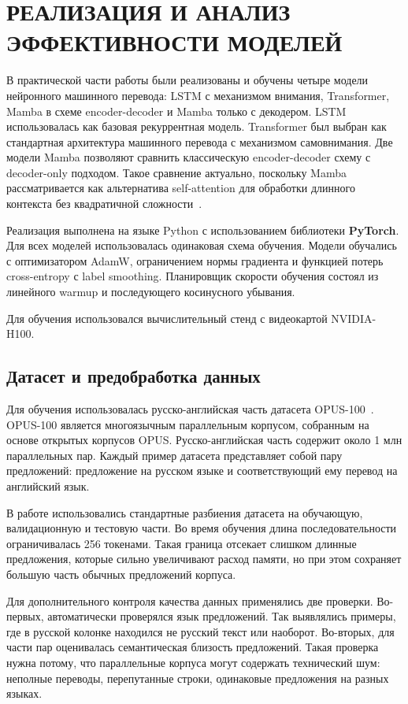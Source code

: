 \section{РЕАЛИЗАЦИЯ И АНАЛИЗ ЭФФЕКТИВНОСТИ МОДЕЛЕЙ}

В практической части работы были реализованы и обучены четыре модели нейронного машинного перевода: LSTM с механизмом внимания, Transformer, Mamba в схеме encoder-decoder и Mamba только с декодером.
LSTM использовалась как базовая рекуррентная модель.
Transformer был выбран как стандартная архитектура машинного перевода с механизмом самовнимания.
Две модели Mamba позволяют сравнить классическую encoder-decoder схему с decoder-only подходом.
Такое сравнение актуально, поскольку Mamba рассматривается как альтернатива self-attention для обработки длинного контекста без квадратичной сложности~\cite{transformer,mtssm}.

Реализация выполнена на языке Python с использованием библиотеки \textbf{PyTorch}.
Для всех моделей использовалась одинаковая схема обучения.
Модели обучались с оптимизатором AdamW, ограничением нормы градиента и функцией потерь cross-entropy с label smoothing.
Планировщик скорости обучения состоял из линейного warmup и последующего косинусного убывания.

Для обучения использовался вычислительный стенд с видеокартой NVIDIA-H100.

\subsection{Датасет и предобработка данных}

Для обучения использовалась русско-английская часть датасета OPUS-100~\cite{opus100}.
OPUS-100 является многоязычным параллельным корпусом, собранным на основе открытых корпусов OPUS.
Русско-английская часть содержит около 1 млн параллельных пар.
Каждый пример датасета представляет собой пару предложений: предложение на русском языке и соответствующий ему перевод на английский язык.

В работе использовались стандартные разбиения датасета на обучающую, валидационную и тестовую части.
Во время обучения длина последовательности ограничивалась 256 токенами.
Такая граница отсекает слишком длинные предложения, которые сильно увеличивают расход памяти, но при этом сохраняет большую часть обычных предложений корпуса.

Для дополнительного контроля качества данных применялись две проверки.
Во-первых, автоматически проверялся язык предложений.
Так выявлялись примеры, где в русской колонке находился не русский текст или наоборот.
Во-вторых, для части пар оценивалась семантическая близость предложений.
Такая проверка нужна потому, что параллельные корпуса могут содержать технический шум: неполные переводы, перепутанные строки, одинаковые предложения на разных языках.

